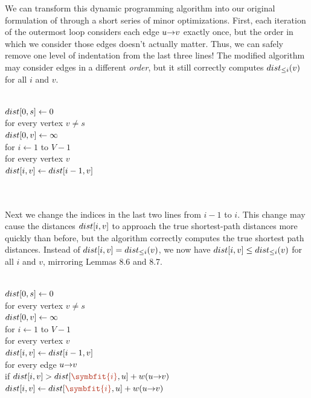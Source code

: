 We can transform this dynamic programming algorithm into our original formulation of  through a short series of minor optimizations.
First, each iteration of the outermost loop considers each edge $u\mathord{\rightarrow}v$ exactly once, but the order in which we consider those edges doesn’t actually matter.
Thus, we can safely remove one level of indentation from the last three lines!
The modified algorithm may consider edges in a different \textit{order}, but it still correctly computes $dist_{\le i}(v)$ for all $i$ and $v$.

\begin{pseudocode}
\\
$dist[0, s] \gets 0$\\
for every vertex $v \neq s$\\
\Indent $dist[0, v] \gets \infty$\\
for $i \gets 1$ to $V - 1$\\
\Indent for every vertex $v$\\
\Indent\Indent $dist[i, v] \gets dist[i - 1, v]$\\
\\
\Indent{}\\
\Indent\Indent{}
\end{pseudocode}

Next we change the indices in the last two lines from $i - 1$ to $i$.
This change may cause the distances $dist[i, v]$ to approach the true shortest-path distances more quickly than before, but the algorithm correctly computes the true shortest path distances.
Instead of $dist[i, v] = dist_{\le i}(v)$, we now have $dist[i, v] \le dist_{\le i}(v)$ for all $i$ and $v$, mirroring Lemmas 8.6 and 8.7.

\begin{pseudocode}
\\
$dist[0, s] \gets 0$\\
for every vertex $v \neq s$\\
\Indent $dist[0, v] \gets \infty$\\
for $i \gets 1$ to $V - 1$\\
\Indent for every vertex $v$\\
\Indent\Indent $dist[i, v] \gets dist[i - 1, v]$\\
\Indent for every edge $u\mathord{\rightarrow}v$\\
\Indent\Indent if $\Var{dist}[i, v] > \Var{dist}[{\color{JEred}\symbfit{i}}, u] + w(\arc{u}{v})$ \\
\Indent\Indent\Indent $\Var{dist}[i, v] \gets \Var{dist}[{\color{JEred}\symbfit{i}}, u] + w(\arc{u}{v})$ 
\end{pseudocode}

